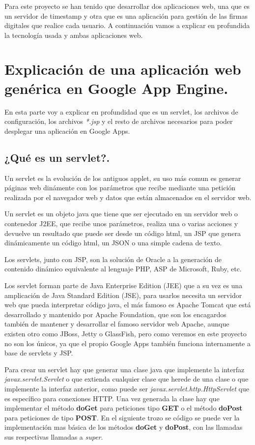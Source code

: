 Para este proyecto se han tenido que desarrollar dos aplicaciones web, una que es un servidor de timestamp y otra que es una aplicación para gestión de las firmas digitales que realice cada usuario. A continuación vamos a explicar en profundida la tecnología usada y ambas aplicaciones web.

\section{Explicación de una aplicación web genérica en Google App Engine.}
En esta parte voy a explicar en profundidad que es un servlet, los archivos de configuración, los archivos \textit{*.jsp} y el resto de archivos necesarios para poder desplegar una aplicación en Google Apps.
 
\subsection{¿Qué es un servlet?.}
Un servlet es la evolución de los antiguos applet, su uso más comun es generar páginas web dinámente con los parámetros que recibe mediante una petición realizada por el navegador web y datos que están almacenados en el servidor web.

Un servlet es un objeto java que tiene que ser ejecutado en un servidor web o contenedor J2EE, que recibe unos parámetros, realiza una o varias acciones y devuelve un resultado que puede ser desde un código html, un JSP que genera dinámicamente un código html, un JSON o una simple cadena de texto.

Los servlets, junto con JSP, son la solución de Oracle a la generación de contenido dinámico equivalente al lenguaje PHP, ASP de Microsoft, Ruby, etc.

Los servlet forman parte de Java Enterprise Edition (JEE) que a su vez es una amplicación de Java Standard Edition (JSE), para usarlos necesita un servidor web que pueda interpretar código java, el más famoso es Apache Tomcat que está desarrollado y mantenido por Apache Foundation, que son los encagardos también de mantener y desarrollar el famoso servidor web Apache, aunque existen otro como JBoss, Jetty o GlassFish, pero como veremos en este proyecto no son los únicos, ya que el propio Google Apps también funciona internamente a base de servlets y JSP.

Para crear un servlet hay que generar una clase java que implemente la interfaz \textit{javax.servlet.Servlet} o que extienda cualquier clase que herede de una clase o que implemente la interfaz anterior, como puede ser \textit{javax.servlet.http.HttpServlet} que es específico para conexiones HTTP. 
Una vez generada la clase hay que implementar el método \textbf{doGet} para peticiones tipo \textbf{GET} o el método \textbf{doPost} para peticiones de tipo \textbf{POST}. En el siguiente trozo se código se puede ver la implementación mas básica de los métodos \textbf{doGet} y \textbf{doPost}, con las llamadas sus respectivas llamadas a \textit{super}.

